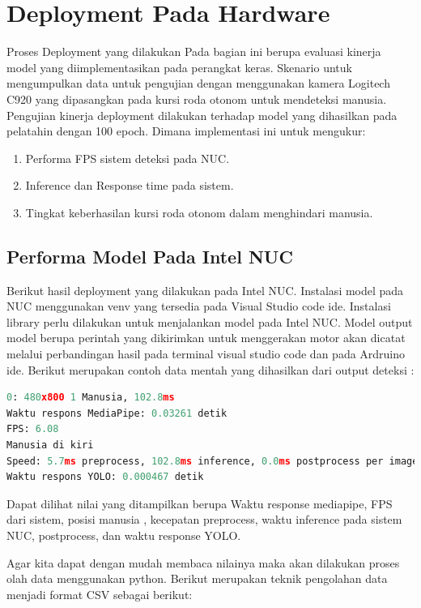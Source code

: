 \section{Deployment Pada Hardware}
Proses Deployment yang dilakukan Pada bagian ini berupa evaluasi kinerja model yang diimplementasikan pada perangkat keras. Skenario untuk mengumpulkan data untuk pengujian dengan menggunakan kamera Logitech C920 yang dipasangkan pada kursi roda otonom untuk mendeteksi manusia. Pengujian kinerja deployment dilakukan terhadap model yang dihasilkan pada pelatahin dengan 100 epoch. Dimana implementasi ini untuk mengukur:
\begin{enumerate} 
    \item Performa FPS sistem deteksi pada NUC.
    \item Inference dan Response time pada sistem.
    \item Tingkat keberhasilan kursi roda otonom dalam menghindari manusia.
\end{enumerate}

\subsection{Performa Model Pada Intel NUC}
Berikut hasil deployment yang dilakukan pada Intel NUC. Instalasi model pada NUC menggunakan venv yang tersedia pada Visual Studio code ide. Instalasi library perlu dilakukan untuk menjalankan model pada Intel NUC. Model output model berupa perintah yang dikirimkan untuk menggerakan motor akan dicatat melalui perbandingan hasil pada terminal visual studio code dan pada Ardruino ide. Berikut merupakan contoh data mentah yang dihasilkan dari output deteksi : 

\begin{lstlisting}[language = python]
0: 480x800 1 Manusia, 102.8ms
Waktu respons MediaPipe: 0.03261 detik
FPS: 6.08
Manusia di kiri
Speed: 5.7ms preprocess, 102.8ms inference, 0.0ms postprocess per image at shape (1, 3, 480, 800)
Waktu respons YOLO: 0.000467 detik
\end{lstlisting}

Dapat dilihat nilai yang ditampilkan berupa Waktu response mediapipe, FPS dari sistem, posisi manusia , kecepatan preprocess, waktu inference pada sistem NUC, postprocess, dan waktu response YOLO.

Agar kita dapat dengan mudah membaca nilainya maka akan dilakukan proses olah data menggunakan python. Berikut merupakan teknik pengolahan data menjadi format CSV sebagai berikut:

